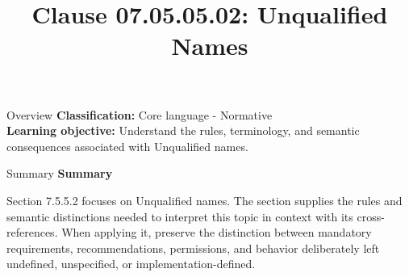 \documentclass[10pt,letterpaper]{article}
\title{Clause 07.05.05.02: Unqualified Names}
\author{}
\date{}
\begin{document}
\maketitle
\begin{CornellOverviewBox}{Overview}
\textbf{Classification:} Core language - Normative\\[2pt]
\textbf{Learning objective:} Understand the rules, terminology, and semantic consequences associated with Unqualified names.
\end{CornellOverviewBox}\begin{CornellSummaryBox}{Summary}
{\sffamily\bfseries\color{Accent} Summary}\par\vspace{3pt}Section 7.5.5.2 focuses on Unqualified names. The section supplies the rules and semantic distinctions needed to interpret this topic in context with its cross-references. When applying it, preserve the distinction between mandatory requirements, recommendations, permissions, and behavior deliberately left undefined, unspecified, or implementation-defined.
\end{CornellSummaryBox}
\end{document}
